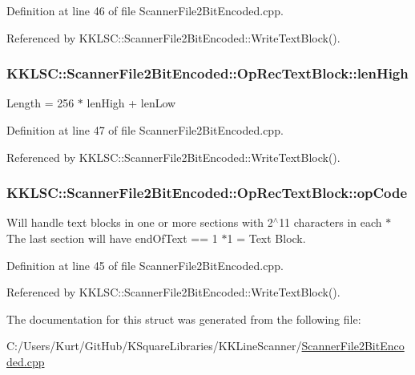 Definition at line 46 of file Scanner\+File2\+Bit\+Encoded.\+cpp.



Referenced by K\+K\+L\+S\+C\+::\+Scanner\+File2\+Bit\+Encoded\+::\+Write\+Text\+Block().

\subsubsection[{\texorpdfstring{len\+High}{lenHigh}}]{ K\+K\+L\+S\+C\+::\+Scanner\+File2\+Bit\+Encoded\+::\+Op\+Rec\+Text\+Block\+::len\+High}\hypertarget{struct_scanner_file2_bit_encoded_1_1_op_rec_text_block_a8492087b806d5c17e43c2110210461e6}{}\label{struct_scanner_file2_bit_encoded_1_1_op_rec_text_block_a8492087b806d5c17e43c2110210461e6}
Length = 256 $\ast$ len\+High + len\+Low 

Definition at line 47 of file Scanner\+File2\+Bit\+Encoded.\+cpp.



Referenced by K\+K\+L\+S\+C\+::\+Scanner\+File2\+Bit\+Encoded\+::\+Write\+Text\+Block().

\subsubsection[{\texorpdfstring{op\+Code}{opCode}}]{ K\+K\+L\+S\+C\+::\+Scanner\+File2\+Bit\+Encoded\+::\+Op\+Rec\+Text\+Block\+::op\+Code}\hypertarget{struct_scanner_file2_bit_encoded_1_1_op_rec_text_block_a6fb01ee0c32a5a3d530506ae0dc4d306}{}\label{struct_scanner_file2_bit_encoded_1_1_op_rec_text_block_a6fb01ee0c32a5a3d530506ae0dc4d306}
Will handle text blocks in one or more sections with 2$^\wedge$11 characters in each $\ast$ The last section will have \textquotesingle{}end\+Of\+Text\textquotesingle{} == \textquotesingle{}1\textquotesingle{} $\ast$1 = Text Block. 

Definition at line 45 of file Scanner\+File2\+Bit\+Encoded.\+cpp.



Referenced by K\+K\+L\+S\+C\+::\+Scanner\+File2\+Bit\+Encoded\+::\+Write\+Text\+Block().



The documentation for this struct was generated from the following file\+:\begin{DoxyCompactItemize}
\item 
C\+:/\+Users/\+Kurt/\+Git\+Hub/\+K\+Square\+Libraries/\+K\+K\+Line\+Scanner/\hyperlink{_scanner_file2_bit_encoded_8cpp}{Scanner\+File2\+Bit\+Encoded.\+cpp}\end{DoxyCompactItemize}
